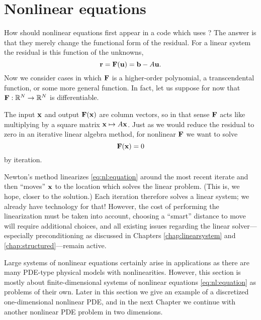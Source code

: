 \renewcommand{\CODELOC}{c/ch4/}

\chapter{Nonlinear equations}
\label{chap:nonlinear}

How should nonlinear equations first appear in a code which uses \PETSc?  The answer is that they merely change the functional form of the residual.  For a linear system the residual is this function of the unknowns,
\begin{equation}
\mathbf{r} = \mathbf{F}(\mathbf{u}) = \mathbf{b} - A \mathbf{u}. \label{eq:nl:linres}
\end{equation}
Now we consider cases in which $\mathbf{F}$ is a higher-order polynomial, a transcendental function, or some more general function.  In fact, let us suppose for now that $\mathbf{F} : \mathbb{R}^N \to \mathbb{R}^N$ is differentiable.

The input $\mathbf{x}$ and output $\mathbf{F}(\mathbf{x})$ are column vectors, so in that sense $\mathbf{F}$ acts like multiplying by a square matrix $\mathbf{x}\mapsto A\mathbf{x}$.  Just as we would reduce the residual to zero in an iterative linear algebra method, for nonlinear $\mathbf{F}$ we want to solve
\begin{equation}
   \mathbf{F}(\mathbf{x}) = 0   \label{eq:nl:equation}
\end{equation}
by iteration.

Newton's method linearizes \eqref{eq:nl:equation} around the most recent iterate and then ``moves'' $\mathbf{x}$ to the location which solves the linear problem.  (This is, we hope, closer to the solution.)  Each iteration therefore solves a linear system; we already have \PETSc technology for that!  However, the cost of performing the linearization must be taken into account, choosing a ``smart'' distance to move will require additional choices, and all existing issues regarding the linear solver---especially preconditioning as discussed in Chapters \ref{chap:linearsystem} and \ref{chap:structured}---remain active.

Large systems of nonlinear equations certainly arise in applications as there are many PDE-type physical models with nonlinearities.  However, this section is mostly about finite-dimensional systems of nonlinear equations \eqref{eq:nl:equation} as problems of their own.  Later in this section we give an example of a discretized one-dimensional nonlinear PDE, and in the next Chapter we continue with another nonlinear PDE problem in two dimensions.


